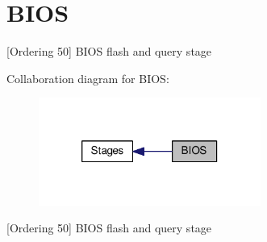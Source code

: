 \hypertarget{group__BIOS}{\section{B\-I\-O\-S}
\label{group__BIOS}
}


\mbox{[}Ordering 50\mbox{]} B\-I\-O\-S flash and query stage  


Collaboration diagram for B\-I\-O\-S\-:
\nopagebreak
\begin{figure}[H]
\begin{center}
\leavevmode
\includegraphics[width=206pt]{group__BIOS}
\end{center}
\end{figure}
\mbox{[}Ordering 50\mbox{]} B\-I\-O\-S flash and query stage 